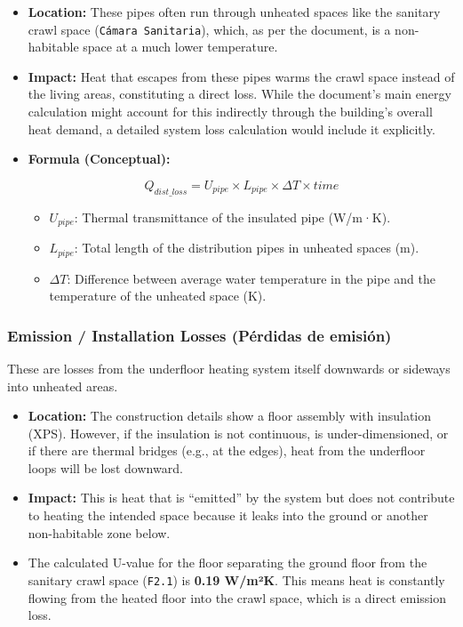 \documentclass[
  10pt,
  letterpaper,
]{scrbook}
\providecommand{\tightlist}{%
  \setlength{\itemsep}{0pt}\setlength{\parskip}{0pt}}
\begin{document}
\begin{itemize}
\item
  \textbf{Location:} These pipes often run through unheated spaces like
  the sanitary crawl space (\texttt{Cámara\ Sanitaria}), which, as per
  the document, is a non-habitable space at a much lower temperature.
\item
  \textbf{Impact:} Heat that escapes from these pipes warms the crawl
  space instead of the living areas, constituting a direct loss. While
  the document's main energy calculation might account for this
  indirectly through the building's overall heat demand, a detailed
  system loss calculation would include it explicitly.
\item
  \textbf{Formula (Conceptual):}

  \[Q_{dist\_loss} = U_{pipe} \times L_{pipe} \times \Delta T \times time\]

  \begin{itemize}
  \tightlist
  \item
    \(U_{pipe}\): Thermal transmittance of the insulated pipe (W/m·K).
  \item
    \(L_{pipe}\): Total length of the distribution pipes in unheated
    spaces (m).
  \item
    \(\Delta T\): Difference between average water temperature in the
    pipe and the temperature of the unheated space (K).
  \end{itemize}
\end{itemize}

\subsubsection{Emission / Installation Losses (Pérdidas de
emisión)}\label{emission-installation-losses-puxe9rdidas-de-emisiuxf3n}

These are losses from the underfloor heating system itself downwards or
sideways into unheated areas.

\begin{itemize}
\tightlist
\item
  \textbf{Location:} The construction details show a floor assembly with
  insulation (XPS). However, if the insulation is not continuous, is
  under-dimensioned, or if there are thermal bridges (e.g., at the
  edges), heat from the underfloor loops will be lost downward.
\item
  \textbf{Impact:} This is heat that is ``emitted'' by the system but
  does not contribute to heating the intended space because it leaks
  into the ground or another non-habitable zone below.
\item
  The calculated U-value for the floor separating the ground floor from
  the sanitary crawl space (\texttt{F2.1}) is \textbf{0.19 W/m²K}. This
  means heat is constantly flowing from the heated floor into the crawl
  space, which is a direct emission loss.
\end{itemize}
\end{document}
